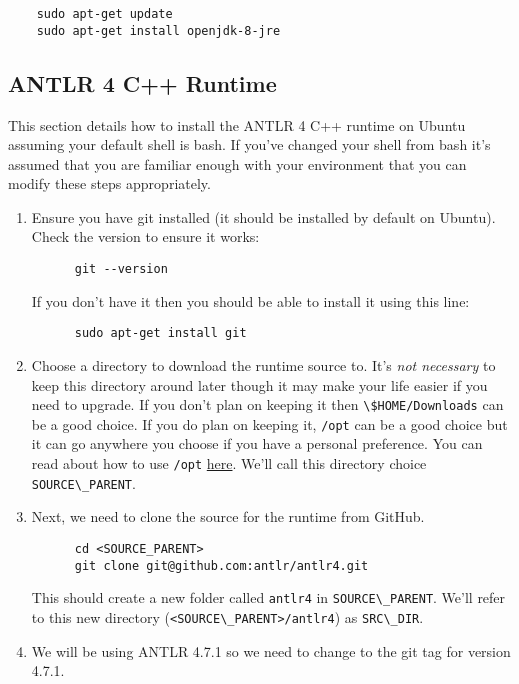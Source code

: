 \documentclass{article}
\begin{document}
\begin{lstlisting}
	sudo apt-get update
	sudo apt-get install openjdk-8-jre
\end{lstlisting}

\subsection{ANTLR 4 C++ Runtime}
This section details how to install the ANTLR 4 C++ runtime on Ubuntu assuming your default shell
is bash. If you've changed your shell from bash it's assumed that you are familiar enough with your
environment that you can modify these steps appropriately.

\begin{enumerate}
  \item
    Ensure you have git installed (it should be installed by default on Ubuntu). Check the version
    to ensure it works:
    \begin{lstlisting}
      git --version
    \end{lstlisting}
    If you don't have it then you should be able to install it using this line:
    \begin{lstlisting}
      sudo apt-get install git
    \end{lstlisting}
  \item
    Choose a directory to download the runtime source to. It's \emph{not necessary} to keep this
    directory around later though it may make your life easier if you need to upgrade. If you don't
    plan on keeping it then \lstinline{\$HOME/Downloads} can be a good choice. If you do plan on
    keeping it, \lstinline{/opt} can be a good choice but it can go anywhere you choose if you have
    a personal preference. You can read about how to use \lstinline{/opt}
    \href{https://askubuntu.com/a/34922/550300} {here}. We'll call this directory choice
    \lstinline{SOURCE\_PARENT}.
  \item
    Next, we need to clone the source for the runtime from GitHub.
    \begin{lstlisting}
      cd <SOURCE_PARENT>
      git clone git@github.com:antlr/antlr4.git
    \end{lstlisting}
    This should create a new folder called \lstinline{antlr4} in \lstinline{SOURCE\_PARENT}. We'll
    refer to this new directory (\lstinline{<SOURCE\_PARENT>/antlr4}) as \lstinline{SRC\_DIR}.
  \item
    We will be using ANTLR 4.7.1 so we need to change to the git tag for version 4.7.1.
    \begin{lstlisting}

\end{lstlisting}
\end{enumerate}
\end{document}
